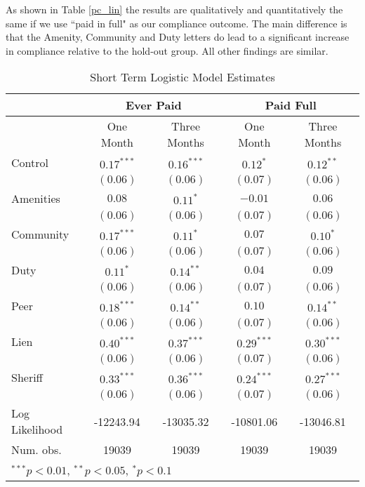 \documentclass[12pt]{article}
\begin{document}
As shown in Table \ref{pc_lin} the results are qualitatively and
quantitatively the same if we use ``paid in full" as our compliance
outcome. The main difference is that the Amenity, Community and Duty
letters do lead to a significant increase in compliance relative to
the hold-out group. All other findings are similar.

\begin{table}[htbp]
\caption{Short Term Logistic Model Estimates}\label{sh_logit}
\bigskip
\centering
\begin{tabular}{l c c c c }
\hline
 & \multicolumn{2}{c}{Ever Paid} & \multicolumn{2}{c}{Paid Full} \\
\hline
 & One Month & Three Months & One Month & Three Months \\
\hline
Control        & $0.17^{***}$ & $0.16^{***}$ & $0.12^{*}$   & $0.12^{**}$  \\
               & $(0.06)$     & $(0.06)$     & $(0.07)$     & $(0.06)$     \\
Amenities      & $0.08$       & $0.11^{*}$   & $-0.01$      & $0.06$       \\
               & $(0.06)$     & $(0.06)$     & $(0.07)$     & $(0.06)$     \\
Community          & $0.17^{***}$ & $0.11^{*}$   & $0.07$       & $0.10^{*}$   \\
               & $(0.06)$     & $(0.06)$     & $(0.07)$     & $(0.06)$     \\
Duty           & $0.11^{*}$   & $0.14^{**}$  & $0.04$       & $0.09$       \\
               & $(0.06)$     & $(0.06)$     & $(0.07)$     & $(0.06)$     \\
Peer           & $0.18^{***}$ & $0.14^{**}$  & $0.10$       & $0.14^{**}$  \\
               & $(0.06)$     & $(0.06)$     & $(0.07)$     & $(0.06)$     \\
Lien           & $0.40^{***}$ & $0.37^{***}$ & $0.29^{***}$ & $0.30^{***}$ \\
               & $(0.06)$     & $(0.06)$     & $(0.07)$     & $(0.06)$     \\
Sheriff        & $0.33^{***}$ & $0.36^{***}$ & $0.24^{***}$ & $0.27^{***}$ \\
               & $(0.06)$     & $(0.06)$     & $(0.07)$     & $(0.06)$     \\
\hline
Log Likelihood & -12243.94    & -13035.32    & -10801.06    & -13046.81    \\
Num. obs.      & 19039        & 19039        & 19039        & 19039        \\
\hline
\multicolumn{5}{l}{\scriptsize{$^{***}p<0.01$, $^{**}p<0.05$, $^*p<0.1$}}
\end{tabular}
\end{table}
\end{document}
